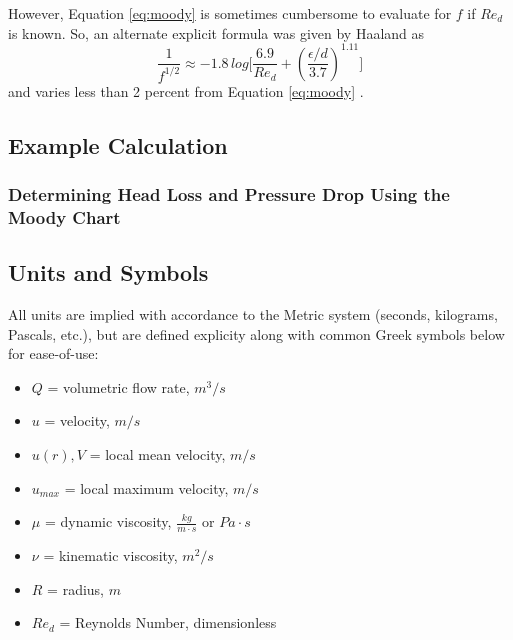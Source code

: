 \documentclass[9pt]{article} %
\numberwithin{equation}{section} %
\begin{document}
\begin{multicols}{2}
However, Equation \ref{eq:moody} is sometimes cumbersome to evaluate for $f$ if $Re_{d}$ is known. So, an alternate explicit formula was given by Haaland as
\begin{equation}
\frac{1}{f^{1/2}} \approx -1.8\, log \big[ \frac{6.9}{Re_{d}} + \left( \frac{\epsilon / d}{3.7} \right)^{1.11} \big]
\end{equation}
and varies less than 2 percent from Equation \ref{eq:moody} \cite{fluid-mechanics}.

\subsection{Example Calculation}
\subsubsection{Determining Head Loss and Pressure Drop Using the Moody Chart}

\subsection{Units and Symbols} \label{sec:units}
All units are implied with accordance to the Metric system (seconds, kilograms, Pascals, etc.), but are defined explicity along with common Greek symbols below for ease-of-use:
\begin{itemize}%
\item $Q$ = volumetric flow rate, $m^{3}/s$
\item $u$ = velocity, $m/s$ 
\item $u(r), V$ = local mean velocity, $m/s$ 
\item $u_{max}$ = local maximum velocity, $m/s$ 
\item $\mu$ = dynamic viscosity, $\frac{kg}{m \cdot s}$ or $Pa \cdot s$
\item $\nu$ = kinematic viscosity, $m^{2}/s$
\item $R$ = radius, $m$
\item $Re_{d}$ = Reynolds Number, dimensionless%

\end{itemize}
\end{multicols}
\printbibliography
\end{document}
